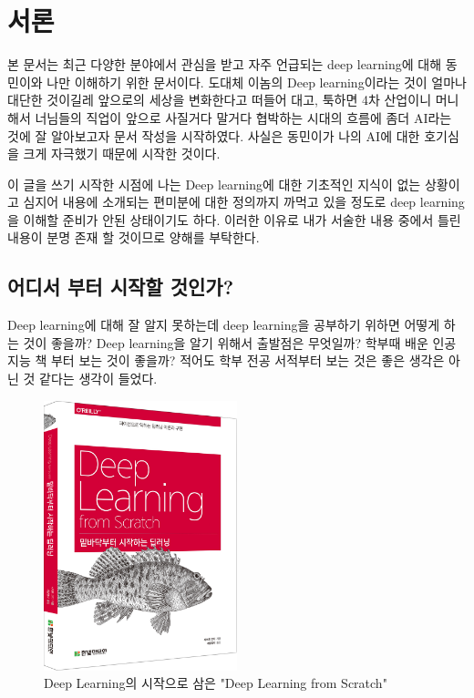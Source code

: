 	\clearpage
	\section{서론}
	
	본 문서는 최근 다양한 분야에서 관심을 받고 자주 언급되는 deep learning에 대해 동민이와 나만 이해하기 위한 문서이다. 도대체 이놈의 Deep learning이라는 것이 얼마나 대단한 것이길레 앞으로의 세상을 변화한다고 떠들어 대고, 툭하면 4차 산업이니 머니 해서 너님들의 직업이 앞으로 사질거다 말거다 협박하는 시대의 흐름에 좀더 AI라는 것에 잘 알아보고자 문서 작성을 시작하였다. 사실은 동민이가 나의 AI에 대한 호기심을 크게 자극했기 때문에 시작한 것이다. 
	
	이 글을 쓰기 시작한 시점에 나는 Deep learning에 대한 기초적인 지식이 없는 상황이고 심지어 내용에 소개되는 편미분에 대한 정의까지 까먹고 있을 정도로 deep learning을 이해할 준비가 안된 상태이기도 하다. 이러한 이유로 내가 서술한 내용 중에서 틀린 내용이 분명 존재 할 것이므로 양해를 부탁한다.
	
	\subsection{어디서 부터 시작할 것인가?}
	Deep learning에 대해 잘 알지 못하는데 deep learning을 공부하기 위하면 어떻게 하는 것이 좋을까? Deep learning을 알기 위해서 출발점은 무엇일까? 학부때 배운 인공지능 책 부터 보는 것이 좋을까? 적어도 학부 전공 서적부터 보는 것은 좋은 생각은 아닌 것 같다는 생각이 들었다. 
	
	\begin{figure}[!h] %
	\centering
	\includegraphics[width=0.5\textwidth]{fig/cover_image.jpg}
	\caption{Deep Learning의 시작으로 삼은 "Deep Learning from Scratch"}
	\label{fig:DL_book_cover}
	\end{figure}
	
